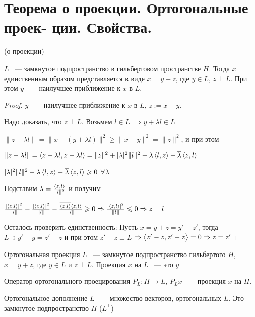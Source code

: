 \section{Теорема о проекции. Ортогональные проек-
ции. Свойства.}

\begin{theorem}(о проекции)
   
    $L$ ~--- замкнутое подпространство в гильбертовом пространстве $H$. Тогда $x$
    единственным образом представляется в виде $x = y+z$, где $y \in L$, $z \perp L$.
    При этом $y$ ~--- наилучшее приближение к $x$ в $L$.
    \end{theorem}
    
    \begin{proof}
    $y$ ~--- наилучшее приближение к $x$ в $L$, $z := x - y$.
    
    Надо доказать, что $z\perp L$. Возьмем $l\in L$ $\Rightarrow y + \lambda l \in L$
    
    $\|z - \lambda l \| = \|x - (y + \lambda l)\|^2\ge \|x - y\|^2  = \|z\|^2$, и при этом
    
    $\|z - \lambda l \| = \left\langle z - \lambda l, z - \lambda l \right\rangle = \|z\|^2 + |\lambda|^2\| l \|^2 - \lambda\left\langle l, z \right\rangle
    - \overline{\lambda}\left\langle z, l \right\rangle$
    
    $|\lambda|^2\| l \|^2 - \lambda \left\langle l, z \right\rangle - \overline{\lambda} \left\langle z, l \right\rangle
    \geqslant 0$ $\forall \lambda$
    
    Подставим $\lambda = \frac{\left\langle z, l \right\rangle}{\| l \|^2}$ и получим 
    
    $\frac{|\left\langle z, l \right\rangle|^2}{\| l \|} - \frac{|\left\langle z, l \right\rangle|^2}{\| l \|}
    - \frac{\overline{\left\langle z, l \right\rangle}\left\langle z, l \right\rangle}{\| l \|} \geqslant 0
    \Rightarrow \frac{|\left\langle z, l \right\rangle|^2}{\| l \|} \leqslant 0 \Rightarrow z\perp l$
    
    Осталось проверить единственность: Пусть $x = y + z = y' + z'$, тогда
    $L \ni y' - y = z' - z$ и при этом $z' - z\perp L$ $\Rightarrow
    \left\langle z' - z, z' - z \right\rangle = 0 \Rightarrow z = z'$
    
    \end{proof}
    
    \begin{definition}
    Ортогональная проекция $L$ ~--- замкнутое подпространство гильбертого $H$, $x = y + z$,
    где $y \in L$ и $z \perp L$. Проекция $x$ на $L$ ~--- это $y$
    \end{definition}
    
    \begin{definition}
    Оператор ортогонального проецирования $P_L : H \rightarrow L$, $P_L x $ ~--- проекция $x$
    на $H$.
    
    Ортогональное дополнение $L$ ~--- множество векторов, ортогональных $L$. Это замкнутое
    подпространство $H$ ($L^\perp$)
    \end{definition}
    
